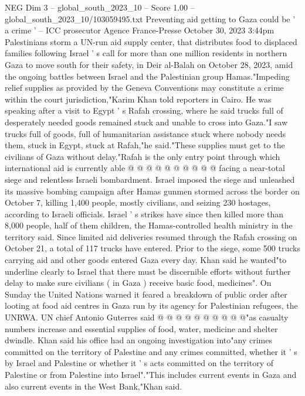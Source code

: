 \begin{textsample}{NEG Dim 3 – global\_south\_2023\_10 – Score 1.00 – global\_south\_2023\_10/103059495.txt}  \label{ex:f3_neg_027}
Preventing aid getting to Gaza could be ' a crime ' -- ICC prosecutor Agence France-Presse October 30, 2023 3:44pm Palestinians storm a UN-run aid supply center, that distributes food to displaced families following Israel ' s call for more than one million residents in northern Gaza to move south for their safety, in Deir al-Balah on October 28, 2023, amid the ongoing battles between Israel and the Palestinian group Hamas."Impeding relief supplies as provided by the Geneva Conventions may constitute a crime within the court jurisdiction,"Karim Khan told reporters in Cairo.
He was speaking after a visit to Egypt ' s Rafah crossing, where he said trucks full of desperately needed goods remained stuck and unable to cross into Gaza."I saw trucks full of goods, full of humanitarian assistance stuck where nobody needs them, stuck in Egypt, stuck at Rafah,"he said."These supplies must get to the civilians of Gaza without delay."Rafah is the only entry point through which international aid is currently able @ @ @ @ @ @ @ @ @ @ facing a near-total siege and relentless Israeli bombardment.
Israel imposed the siege and unleashed its massive bombing campaign after Hamas gunmen stormed across the border on October 7, killing 1,400 people, mostly civilians, and seizing 230 hostages, according to Israeli officials.
Israel ' s strikes have since then killed more than 8,000 people, half of them children, the Hamas-controlled health ministry in the territory said.
Since limited aid deliveries resumed through the Rafah crossing on October 21, a total of 117 trucks have entered.
Prior to the siege, some 500 trucks carrying aid and other goods entered Gaza every day.
Khan said he wanted"to underline clearly to Israel that there must be discernible efforts without further delay to make sure civilians ( in Gaza ) receive basic food, medicines".
On Sunday the United Nations warned it feared a breakdown of public order after looting at food aid centres in Gaza run by its agency for Palestinian refugees, the UNRWA.
UN chief Antonio Guterres said @ @ @ @ @ @ @ @ @ @"as casualty numbers increase and essential supplies of food, water, medicine and shelter dwindle.
Khan said his office had an ongoing investigation into"any crimes committed on the territory of Palestine and any crimes committed, whether it ' s by Israel and Palestine or whether it ' s acts committed on the territory of Palestine or from Palestine into Israel"."This includes current events in Gaza and also current events in the West Bank,"Khan said.

\end{textsample}
